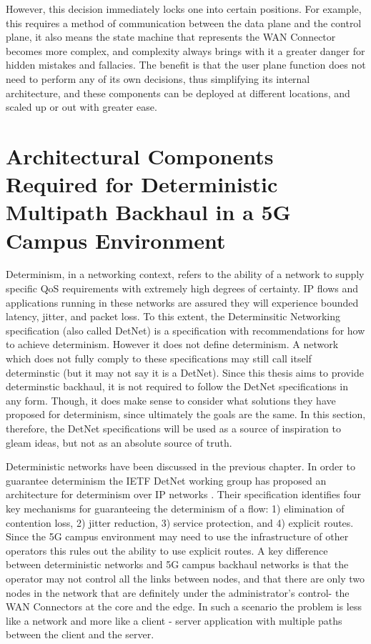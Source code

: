 However, this decision immediately locks one into certain positions. For example, this requires a method of communication between the data plane and the control plane, it also means the state machine that represents the WAN Connector becomes more complex, and complexity always brings with it a greater danger for hidden mistakes and fallacies. The benefit is that the user plane function does not need to perform any of its own decisions, thus simplifying its internal architecture, and these components can be deployed at different locations, and scaled up or out with greater ease.

\section{Architectural Components Required for Deterministic Multipath Backhaul in a 5G Campus Environment}
\label{sec:approach:req}

Determinism, in a networking context, refers to the ability of a network to supply specific QoS requirements with extremely high degrees of certainty. IP flows and applications running in these networks are assured they will experience bounded latency, jitter, and packet loss. To this extent, the Determinsitic Networking specification (also called DetNet) is a specification with recommendations for how to achieve determinism. However it does not define determinism. A network which does not fully comply to these specifications may still call itself determinstic (but it may not say it is a DetNet). Since this thesis aims to provide determinstic backhaul, it is not required to follow the DetNet specifications in any form. Though, it does make sense to consider what solutions they have proposed for determinism, since ultimately the goals are the same. In this section, therefore, the DetNet specifications will be used as a source of inspiration to gleam ideas, but not as an absolute source of truth.

Deterministic networks have been discussed in the previous chapter. In order to guarantee determinism the IETF DetNet working group has proposed an architecture for determinism over IP networks \cite{detnet-arch}. Their specification identifies four key mechanisms for guaranteeing the determinism of a flow: 1) elimination of contention loss, 2) jitter reduction, 3) service protection, and 4) explicit routes. Since the 5G campus environment may need to use the infrastructure of other operators this rules out the ability to use explicit routes. A key difference between deterministic networks and 5G campus backhaul networks is that the operator may not control all the links between nodes, and that there are only two nodes in the network that are definitely under the administrator's control- the WAN Connectors at the core and the edge. In such a scenario the problem is less like a network and more like a client - server application with multiple paths between the client and the server.

